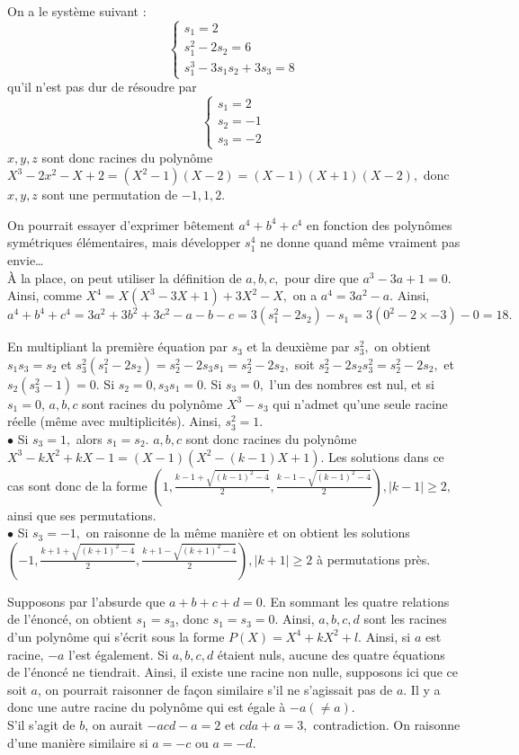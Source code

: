 \begin{sol}On a le système suivant :
\[\begin{cases}
s_1=2\\
s_1^2-2s_2=6\\
s_1^3-3s_1s_2+3s_3=8
\end{cases}\]qu'il n'est pas dur de résoudre par 
$$\begin{cases}
s_1=2\\
s_2=-1\\
s_3=-2
\end{cases}$$
$x,y,z$ sont donc racines du polynôme $X^3-2x^2-X+2=(X^2-1)(X-2)=(X-1)(X+1)(X-2),$ donc $x,y,z$ sont une permutation de $-1,1,2$.
\end{sol}
\begin{sol}
On pourrait essayer d'exprimer bêtement $a^4+b^4+c^4$ en fonction des polynômes symétriques élémentaires, mais développer $s_1^4$ ne donne quand même vraiment pas envie…\\À la place, on peut utiliser la définition de $a,b,c,$ pour dire que $a^3-3a+1=0.$ Ainsi, comme $X^4=X(X^3-3X+1)+3X^2-X,$ on a $a^4=3a^2-a.$ Ainsi, $a^4+b^4+c^4=3a^2+3b^2+3c^2-a-b-c=3(s_1^2-2s_2)-s_1=3(0^2-2\times -3)-0=18.$
\end{sol}
\begin{sol}
En multipliant la première équation par $s_3$ et la deuxième par $s_3^2,$ on obtient $s_1s_3=s_2$ et $s_3^2(s_1^2-2s_2)=s_2^2-2s_3s_1=s_2^2-2s_2,$ soit $s_2^2-2s_2s_3^2=s_2^2-2s_2,$ et $s_2(s_3^2-1)=0.$ Si $s_2=0,s_3s_1=0.$ Si $s_3=0,$ l'un des nombres est nul, et si $s_1=0$, $a,b,c$ sont racines du polynôme $X^3-s_3$ qui n'admet qu'une seule racine réelle (même avec multiplicités). Ainsi, $s_3^2=1.$\\$\bullet$ Si $s_3=1,$ alors $s_1=s_2.$ $a,b,c$ sont donc racines du polynôme $X^3-kX^2+kX-1=(X-1)(X^2-(k-1)X+1).$ Les solutions dans ce cas sont donc de la forme $(1,\frac{k-1+\sqrt{(k-1)^2-4}}2,\frac{k-1-\sqrt{(k-1)^2-4}}2),|k-1|\geqslant 2,$ ainsi que ses permutations.\\
$\bullet$ Si $s_3=-1,$ on raisonne de la même manière et on obtient les solutions $(-1,\frac{k+1+\sqrt{(k+1)^2-4}}2,\frac{k+1-\sqrt{(k+1)^2-4}}2) ,|k+1|\geqslant 2$ à permutations près.
\end{sol}
\begin{sol}
Supposons par l'absurde que $a+b+c+d=0.$ En sommant les quatre relations de l'énoncé, on obtient $s_1=s_3$, donc $s_1=s_3=0.$ Ainsi, $a,b,c,d$ sont les racines d'un polynôme qui s'écrit sous la forme $P(X)=X^4+kX^2+l$. Ainsi, si $a$ est racine, $-a$ l'est également. Si $a,b,c,d$ étaient nuls, aucune des quatre équations de l'énoncé ne tiendrait. Ainsi, il existe une racine non nulle, supposons ici que ce soit $a$, on pourrait raisonner de façon similaire s'il ne s'agissait pas de $a$. Il y a donc une autre racine du polynôme qui est égale à $-a(\ne a)$.\\
S'il s'agit de $b$, on aurait $-acd-a=2$ et $cda+a=3,$ contradiction. On raisonne d'une manière similaire si $a=-c$ ou $a=-d.$
\end{sol}
